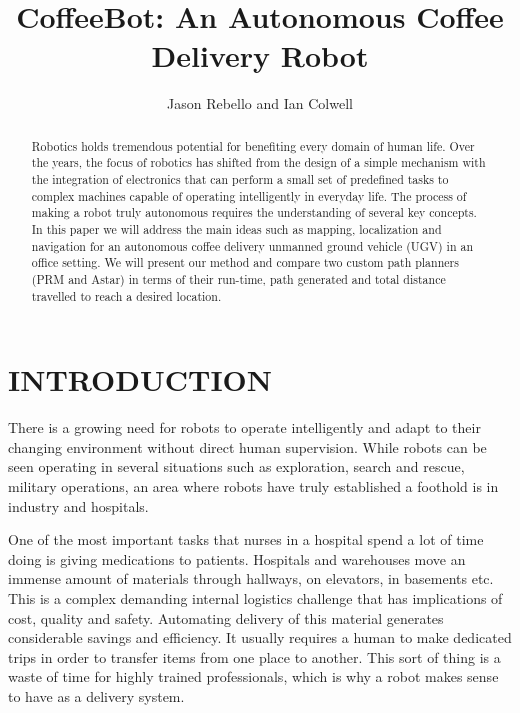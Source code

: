 \documentclass[letterpaper, 10 pt, conference]{ieeeconf}  %
\title{\LARGE \bf
CoffeeBot: An Autonomous Coffee Delivery Robot
}
\author{Jason Rebello and Ian Colwell%
}
\begin{document}
\maketitle
\thispagestyle{empty}
\pagestyle{empty}


\begin{abstract}

Robotics holds tremendous potential for benefiting every domain of human life. Over the years, the focus of robotics has shifted from the design of a simple mechanism with the integration of electronics that can perform a small set of predefined tasks to complex machines capable of operating intelligently in everyday life. The process of making a robot truly autonomous requires the understanding of several key concepts. In this paper we will address the main ideas such as mapping, localization and navigation for an autonomous coffee delivery unmanned ground vehicle (UGV) in an office setting. We will present our method and compare two custom path planners (PRM and Astar) in terms of their run-time, path generated and total distance travelled to reach a desired location.

\end{abstract}

\section{INTRODUCTION}

There is a growing need for robots to operate intelligently and adapt to their changing environment without direct human supervision. While robots can be seen operating in several situations such as exploration, search and rescue, military operations, an area where robots have truly established a foothold is in industry and hospitals.

One of the most important tasks that nurses in a hospital spend a lot of time doing is giving medications to patients. Hospitals and warehouses move an immense amount of materials through hallways, on elevators, in basements etc. This is a complex demanding internal logistics challenge that has implications of cost, quality and safety. Automating delivery of this material generates considerable savings and efficiency. It usually requires a human to make dedicated trips in order to transfer items from one place to another. This sort of thing is a waste of time for highly trained professionals, which is why a robot makes sense to have as a delivery system. 
\end{document}
